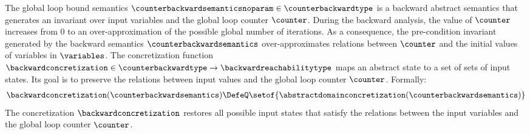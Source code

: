 \newcommand{\s}{\red{\texttt{s}_x}}
The global loop bound semantics $\counterbackwardsemanticsnoparam\in\counterbackwardtype$ is a backward abstract semantics that generates an
invariant over input variables and the global loop counter $\counter$.
%
During the backward analysis, the value of $\counter$ increases from $0$ to an over-approximation of the possible global number of iterations.
As a consequence, the pre-condition invariant generated by the backward semantics $\counterbackwardsemantics$ over-approximates relations between $\counter$ and the initial values of variables in $\variables$.
The concretization function $\backwardconcretization\in\counterbackwardtype\to\backwardreachabilitytype$ maps an abstract state to a set of sets of input states.
Its goal is to preserve the relations between input values and the global loop counter $\counter$.
Formally:
\begin{align*}
  \backwardconcretization(\counterbackwardsemantics) \DefeQ \setof{\abstractdomainconcretization(\counterbackwardsemantics)}
\end{align*}
The concretization $\backwardconcretization$ restores all possible input states that satisfy the relations between the input variables and the global loop counter $\counter$.
%
%
%
